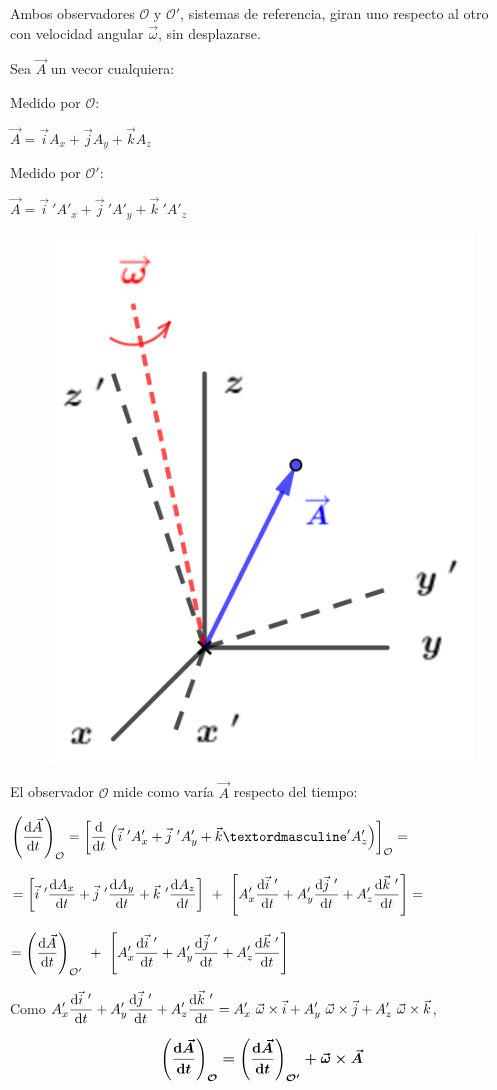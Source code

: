 \begin{multicols}{2}
Ambos observadores $\mathcal O \text{ y } \mathcal O'$, sistemas de referencia, giran uno respecto al otro con velocidad angular $\vec \omega$, sin desplazarse.

Sea $\vec A$ un vecor cualquiera:

Medido por $\mathcal O$:

$\vec A=\vec i A_x+\vec j A_y+ \vec k A_z$

Medido por $\mathcal O'$:

$\vec A=\vec i\ ' A'_x+\vec j\ ' A'_y+ \vec k\ ' A'_z$
\begin{figure}[H]
	\centering
	\includegraphics[width=.3\textwidth]{imagenes/imagenes10/T10IM03.png}
\end{figure}
\end{multicols}

El observador $\mathcal O$ mide como varía $\vec A$ respecto del tiempo:

$\displaystyle \left( \dv{\vec A}{t} \right)_{\mathcal O}=
\left[ \dv{t} \left( \vec i\ ' A'_x+\vec j\ ' A'_y+ \vec kº ' A'_z \right) \right]_{\mathcal O} =$

$= \displaystyle \left[ \vec i\ ' \dv{A_x}{t} + \vec j\ ' \dv{A_y}{t} + \vec k\ ' \dv{A_z}{t} \right] \ + \ 
\left[ A'_x \dv{\vec i\ '}{t} + A'_y \dv{\vec j\ '}{t} + A'_z \dv{\vec k\ '}{t} \right] =$

$= \displaystyle  \left( \dv{\vec A}{t} \right)_{\mathcal O'} \ + \ 
\left[ A'_x \dv{\vec i\ '}{t} + A'_y \dv{\vec j\ '}{t} + A'_z \dv{\vec k\ '}{t} \right] $

Como $\displaystyle A'_x \dv{\vec i\ '}{t} + A'_y \dv{\vec j\ '}{t} + A'_z \dv{\vec k\ '}{t}= A'_x\ \vec \omega \times \vec i + A'_y\ \vec \omega \times \vec j + A'_z\ \vec \omega \times \vec k$,

\begin{equation}
	\boldsymbol{ \left( \dv{\vec A}{t} \right)_{\mathcal O}=\left( \dv{\vec A}{t} \right)_{\mathcal O'}+\vec \omega \times \vec A }
\end{equation}

